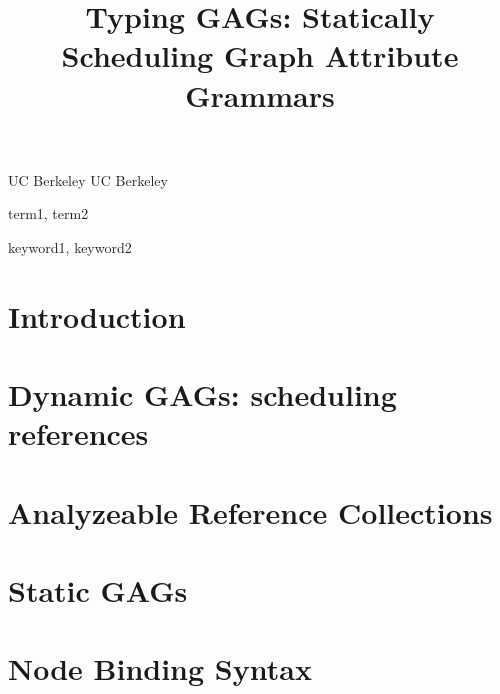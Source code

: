 \documentclass[preprint]{sigplanconf}
\begin{document}
\lstset{language=Java,basicstyle=\small}



\title{Typing GAGs: Statically Scheduling Graph Attribute Grammars}

           {UC Berkeley}
           {}
           {UC Berkeley}
           {}

\maketitle

\begin{abstract}

\end{abstract}


\terms
term1, term2

\keywords
keyword1, keyword2

\section{Introduction}


\section{Dynamic GAGs: scheduling references}
\label{sec:dynamic}


\section{Analyzeable Reference Collections}
\label{sec:collections}


\section{Static GAGs}
\label{sec:staticgags}


\section{Node Binding Syntax}
\label{sec:syntax}
\end{document}
